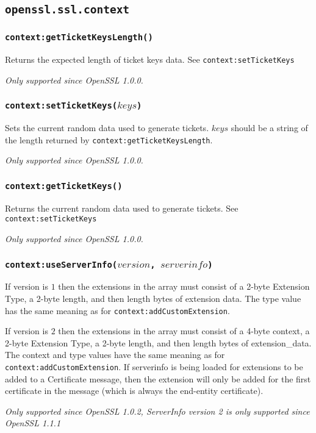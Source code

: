 \documentclass[11pt, oneside]{memoir}
\newcommand*{\fn}[1]{\texttt{#1}\xspace}
\newcounter{toccols}
\newenvironment{Module}[1]{
	\subsection{\texttt{#1}}
	\addtocontents{toc}{
		\protect\begin{multicols}{\value{toccols}}
	}
}{
	\addtocontents{toc}{\protect\end{multicols}}
}
\begin{document}
\begin{Module}{openssl.ssl.context}
\subsubsection[\fn{context:getTicketKeysLength}]{\fn{context:getTicketKeysLength()}}

Returns the expected length of ticket keys data.
See \fn{context:setTicketKeys}

\emph{Only supported since OpenSSL 1.0.0.}

\subsubsection[\fn{context:setTicketKeys}]{\fn{context:setTicketKeys($keys$)}}

Sets the current random data used to generate tickets. $keys$ should be a string of the length returned by \fn{context:getTicketKeysLength}.

\emph{Only supported since OpenSSL 1.0.0.}

\subsubsection[\fn{context:getTicketKeys}]{\fn{context:getTicketKeys()}}

Returns the current random data used to generate tickets.
See \fn{context:setTicketKeys}

\emph{Only supported since OpenSSL 1.0.0.}

\subsubsection[\fn{context:useServerInfo}]{\fn{context:useServerInfo($version$, $serverinfo$)}}

If version is $1$ then the extensions in the array must consist of a 2-byte Extension Type, a 2-byte length, and then length bytes of extension data. The type value has the same meaning as for \fn{context:addCustomExtension}.

If version is $2$ then the extensions in the array must consist of a 4-byte context, a 2-byte Extension Type, a 2-byte length, and then length bytes of extension\_data. The context and type values have the same meaning as for \fn{context:addCustomExtension}. If serverinfo is being loaded for extensions to be added to a Certificate message, then the extension will only be added for the first certificate in the message (which is always the end-entity certificate).

\emph{Only supported since OpenSSL 1.0.2, ServerInfo version 2 is only supported since OpenSSL 1.1.1}


\end{Module}
\end{document}
